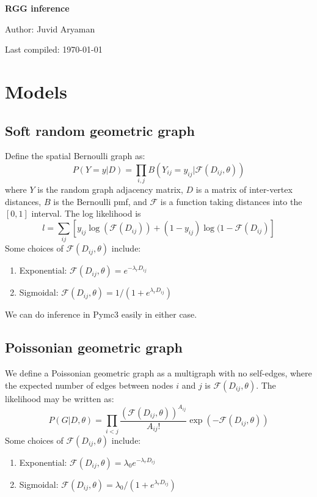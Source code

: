 \documentclass[11pt]{article}
\numberwithin{equation}{section}
\begin{document}
\begin{flushleft}
\textbf{\Large RGG inference}
\end{flushleft}

\begin{flushleft}
Author: Juvid Aryaman

Last compiled: \today
\end{flushleft}

\section{Models}

\subsection{Soft random geometric graph}

Define the spatial Bernoulli graph as:
\begin{equation}
P(Y=y|D) = \prod_{i,j} B(Y_{ij} = y_{ij}| \mathcal{F}(D_{ij}, \theta))
\end{equation}
where $Y$ is the random graph adjacency matrix, $D$ is a matrix of inter-vertex distances, $B$ is the Bernoulli pmf, and $\mathcal{F}$ is a function taking distances into the $[0,1]$ interval. The log likelihood is
\begin{equation}
l = \sum_{ij}[ y_{ij}\log(\mathcal{F}(D_{ij})) + (1-y_{ij})  \log(1 - \mathcal{F}(D_{ij})   ]
\end{equation}
\noindent Some choices of $\mathcal{F}(D_{ij}, \theta)$ include:
\begin{enumerate}
\item Exponential: $\mathcal{F}(D_{ij}, \theta) = e^{-\lambda_r D_{ij}}$
\item Sigmoidal: $\mathcal{F}(D_{ij}, \theta) = 1/(1 + e^{\lambda_r D_{ij}})$
\end{enumerate}
We can do inference in Pymc3 easily in either case.

\subsection{Poissonian geometric graph}
We define a Poissonian geometric graph as a multigraph with no self-edges, where the expected number of edges between nodes $i$ and $j$ is $\mathcal{F}(D_{ij}, \theta)$. The likelihood may be written as:
\begin{equation}
P(G|D, \theta) = \prod_{i<j} \frac{(\mathcal{F}(D_{ij}, \theta))^{A_{ij}}}{A_{ij}!} \exp(-\mathcal{F}(D_{ij}, \theta))
\end{equation}
\noindent Some choices of $\mathcal{F}(D_{ij}, \theta)$ include:
\begin{enumerate}
\item Exponential: $\mathcal{F}(D_{ij}, \theta) = \lambda_0 e^{-\lambda_r D_{ij}}$
\item Sigmoidal: $\mathcal{F}(D_{ij}, \theta) = \lambda_0/(1 + e^{\lambda_r D_{ij}})$
\end{enumerate}
\end{document}
